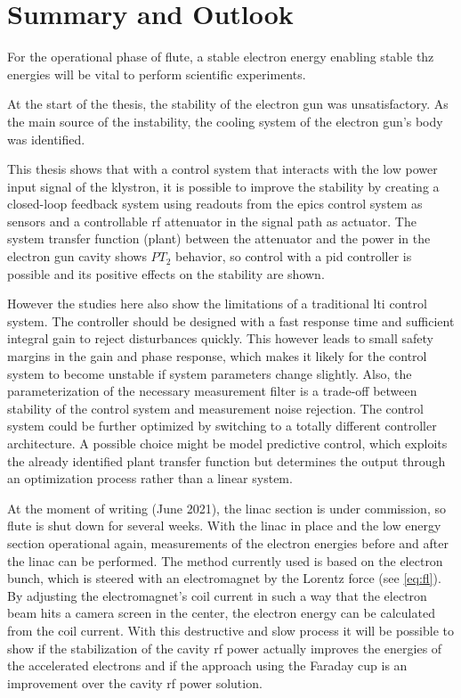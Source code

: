 \chapter{Summary and Outlook}
For the operational phase of \gls{flute}, a stable electron energy enabling stable \gls{thz} energies will be vital to perform scientific experiments.

At the start of the thesis, the stability of the electron gun was unsatisfactory. As the main source of the instability, the cooling system of the electron gun's body was identified.

This thesis shows that with a control system that interacts with the low power input signal of the klystron, it is possible to improve the stability by creating a closed-loop feedback system using readouts from the \gls{epics} control system as sensors and a controllable \gls{rf} attenuator in the signal path as actuator. The system transfer function (plant) between the attenuator and the power in the electron gun cavity shows $PT_2$ behavior, so control with a \gls{pid} controller is possible and its positive effects on the stability are shown.

However the studies here also show the limitations of a traditional \gls{lti} control system. The controller should be designed with a fast response time and sufficient integral gain to reject disturbances quickly. This however leads to small safety margins in the gain and phase response, which makes it likely for the control system to become unstable if system parameters change slightly. Also, the parameterization of the necessary measurement filter is a trade-off between stability of the control system and measurement noise rejection. The control system could be further optimized by switching to a totally different controller architecture. A possible choice might be model predictive control, which exploits the already identified plant transfer function but determines the output through an optimization process rather than a linear system.

At the moment of writing (June 2021), the \gls{linac} section is under commission, so \gls{flute} is shut down for several weeks. With the \gls{linac} in place and the low energy section operational again, measurements of the electron energies before and after the \gls{linac} can be performed. The method currently used is based on the electron bunch, which is steered with an electromagnet by the Lorentz force (see \autoref{eq:fl}). By adjusting the electromagnet's coil current in such a way that the electron beam hits a camera screen in the center, the electron energy can be calculated from the coil current. With this destructive and slow process it will be possible to show if the stabilization of the cavity \gls{rf} power actually improves the energies of the accelerated electrons and if the approach using the Faraday cup is an improvement over the cavity \gls{rf} power solution.

